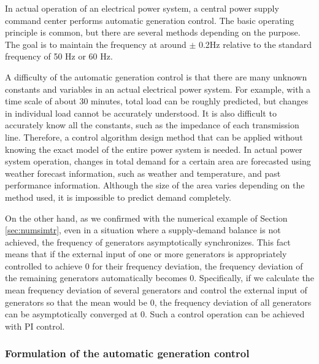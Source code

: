 \documentclass[tombow,dvipdfmx]{corona-a5-1.1}
\begin{document}
In actual operation of an electrical power system, a central power supply command center performs automatic generation control.
The basic operating principle is common, but there are several methods depending on the purpose.
The goal is to maintain the frequency at around $\pm$ 0.2Hz relative to the standard frequency of 50 Hz or 60 Hz.


A difficulty of the automatic generation control is that there are many unknown constants and variables in an actual electrical power system.
For example, with a time scale of about 30 minutes, total load can be roughly predicted, but changes in individual load cannot be accurately understood.
It is also difficult to accurately know all the constants, such as the impedance of each transmission line.
Therefore, a control algorithm design method that can be applied without knowing the exact model of the entire power system is needed.
In actual power system operation, changes in total demand for a certain area are forecasted using weather forecast information, such as weather and temperature, and past performance information.
Although the size of the area varies depending on the method used, it is impossible to predict demand completely.


On the other hand, as we confirmed with the numerical example of Section \ref{sec:numsimtr}, even in a situation where a supply-demand balance is not achieved, the frequency of generators asymptotically synchronizes.
This fact means that if the external input of one or more generators is appropriately controlled to achieve 0 for their frequency deviation, the frequency deviation of the remaining generators automatically becomes 0.
Specifically, if we calculate the mean frequency deviation of several generators and control the external input of generators so that the mean would be 0, the frequency deviation of all generators can be asymptotically converged at 0.
Such a control operation can be achieved with PI control.


\smallskip
\subsubsection{Formulation of the automatic generation control}
\end{document}

